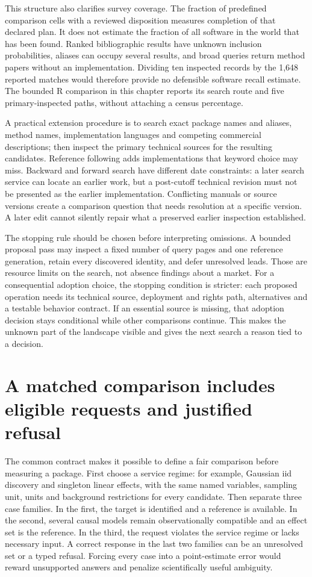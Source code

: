 This structure also clarifies survey coverage. The fraction of predefined
comparison cells with a reviewed disposition measures completion of that
declared plan. It does not estimate the fraction of all software in the world
that has been found. Ranked bibliographic results have unknown inclusion
probabilities, aliases can occupy several results, and broad queries return
method papers without an implementation. Dividing ten inspected records by
the 1,648 reported matches would therefore provide no defensible software
recall estimate. The bounded R comparison in this chapter reports its search
route and five primary-inspected paths, without attaching a census percentage.

A practical extension procedure is to search exact package names and aliases,
method names, implementation languages and competing commercial descriptions;
then inspect the primary technical sources for the resulting candidates.
Reference following adds implementations that keyword choice may miss.
Backward and forward search have different date constraints: a later search
service can locate an earlier work, but a post-cutoff technical revision must
not be presented as the earlier implementation. Conflicting manuals or
source versions create a comparison question that needs resolution at a
specific version. A later edit cannot silently repair what a preserved
earlier inspection established.

The stopping rule should be chosen before interpreting omissions. A bounded
proposal pass may inspect a fixed number of query pages and one reference
generation, retain every discovered identity, and defer unresolved leads.
Those are resource limits on the search, not absence findings about a market.
For a consequential adoption choice, the stopping condition is stricter:
each proposed operation needs its technical source, deployment and rights
path, alternatives and a testable behavior contract. If an essential source
is missing, that adoption decision stays conditional while other comparisons
continue. This makes the unknown part of the landscape visible and gives
the next search a reason tied to a decision.

\section{A matched comparison includes eligible requests and justified refusal}
\label{exec13:survey-comparison}

The common contract makes it possible to define a fair comparison before
measuring a package. First choose a service regime: for example, Gaussian
iid discovery and singleton linear effects, with the same named variables,
sampling unit, units and background restrictions for every candidate. Then
separate three case families. In the first, the target is identified and a
reference is available. In the second, several causal models remain
observationally compatible and an effect set is the reference. In the third,
the request violates the service regime or lacks necessary input. A correct
response in the last two families can be an unresolved set or a typed refusal.
Forcing every case into a point-estimate error would reward unsupported
answers and penalize scientifically useful ambiguity.

